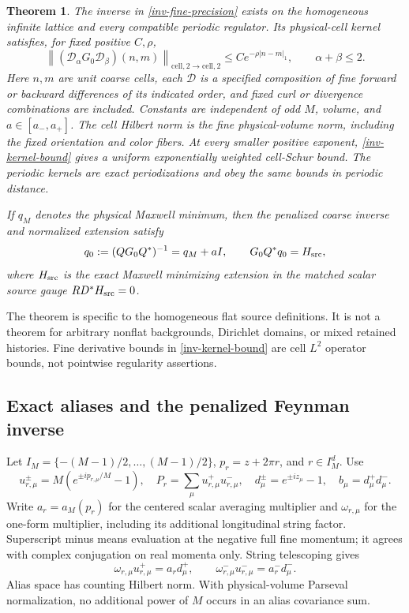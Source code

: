 \documentclass[11pt]{article}
\newtheorem{theorem}{Theorem}[section]
\theoremstyle{remark}
\newcommand{\norm}[1]{\left\|#1\right\|}
\begin{document}
\begin{theorem}\label{inv-theorem}
The inverse in \eqref{inv-fine-precision} exists on the homogeneous
infinite lattice and every compatible periodic regulator. Its
physical-cell kernel satisfies, for fixed positive $C,\rho$,
\begin{equation}\label{inv-kernel-bound}
 \norm{(\mathcal D_\alpha G_0\mathcal D_\beta)(n,m)}
 _{\mathrm{cell},2\to\mathrm{cell},2}
 \le Ce^{-\rho|n-m|_1},\qquad \alpha+\beta\le2.
\end{equation}
Here $n,m$ are unit coarse cells, each $\mathcal D$ is a specified
composition of fine forward or backward differences of its indicated
order, and fixed curl or divergence combinations are included.
Constants are independent of odd $M$, volume, and $a\in[a_-,a_+]$.
The cell Hilbert norm is the fine physical-volume norm, including the
fixed orientation and color fibers. At every smaller positive exponent,
\eqref{inv-kernel-bound} gives a uniform exponentially weighted
cell-Schur bound. The periodic kernels are exact periodizations and
obey the same bounds in periodic distance.

If $q_M$ denotes the physical Maxwell minimum, then the penalized
coarse inverse and normalized extension satisfy
\begin{equation}\label{inv-coarse-result}
 q_0:=(QG_0Q^*)^{-1}=q_M+aI,
 \qquad G_0Q^*q_0=H_{\rm src},
\end{equation}
where $H_{\rm src}$ is the exact Maxwell minimizing extension in the
matched scalar source gauge $RD^*H_{\rm src}=0$.
\end{theorem}

The theorem is specific to the homogeneous flat source definitions.
It is not a theorem for arbitrary nonflat backgrounds, Dirichlet
domains, or mixed retained histories. Fine derivative bounds in
\eqref{inv-kernel-bound} are cell $L^2$ operator bounds, not
pointwise regularity assertions.

\subsection{Exact aliases and the penalized Feynman inverse}

Let $I_M=\{-(M-1)/2,\ldots,(M-1)/2\}$,
$p_r=z+2\pi r$, and $r\in I_M^d$. Use
\[
 u_{r,\mu}^{\pm}=M(e^{\pm ip_{r,\mu}/M}-1),\quad
 P_r=\sum_\mu u_{r,\mu}^+u_{r,\mu}^-,\quad
 d_\mu^\pm=e^{\pm iz_\mu}-1,\quad b_\mu=d_\mu^+d_\mu^-.
\]
Write $a_r=a_M(p_r)$ for the centered scalar averaging multiplier
and $\omega_{r,\mu}$ for the one-form multiplier, including its
additional longitudinal string factor. Superscript minus means
evaluation at the negative full fine momentum; it agrees with
complex conjugation on real momenta only. String telescoping gives
\begin{equation}\label{inv-cochain}
 \omega_{r,\mu}u_{r,\mu}^+=a_r d_\mu^+,
 \qquad \omega_{r,\mu}^-u_{r,\mu}^-=a_r^-d_\mu^-.
\end{equation}
Alias space has counting Hilbert norm. With physical-volume Parseval
normalization, no additional power of $M$ occurs in an alias covariance
sum.
\end{document}
